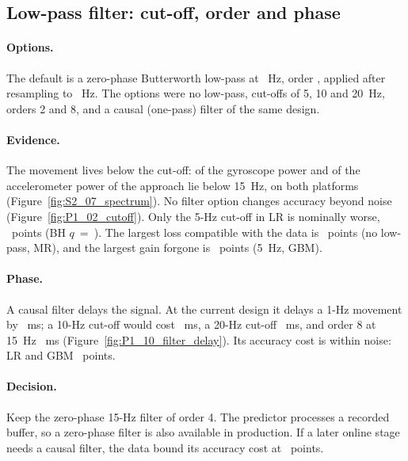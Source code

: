 
\subsection{Low-pass filter: cut-off, order and phase}\label{app:prep:filter}

\paragraph{Options.} The default is a zero-phase Butterworth low-pass at ~Hz, order
, applied after resampling to ~Hz. The options were no low-pass, cut-offs
of 5, 10 and 20~Hz, orders 2 and 8, and a causal (one-pass) filter of the same design.

\paragraph{Evidence.} The movement lives below the cut-off:  of the
gyroscope power and  of the accelerometer power of the approach lie
below 15~Hz, on both platforms (Figure~\ref{fig:S2_07_spectrum}). No filter option changes accuracy beyond
noise (Figure~\ref{fig:P1_02_cutoff}). Only the 5-Hz cut-off in LR is nominally worse,
~points (BH $q$~=~). The largest loss compatible with the data is
~points (no low-pass, MR), and the largest gain forgone is
~points (5~Hz, GBM).

\paragraph{Phase.} A causal filter delays the signal. At the current design it delays a 1-Hz movement by
~ms; a 10-Hz cut-off would cost ~ms, a 20-Hz cut-off
~ms, and order 8 at 15~Hz ~ms
(Figure~\ref{fig:P1_10_filter_delay}). Its accuracy cost is within noise: LR  and GBM
~points.

\paragraph{Decision.} Keep the zero-phase 15-Hz filter of order 4. The predictor processes a recorded
buffer, so a zero-phase filter is also available in production. If a later online stage needs a causal
filter, the data bound its accuracy cost at ~points.

